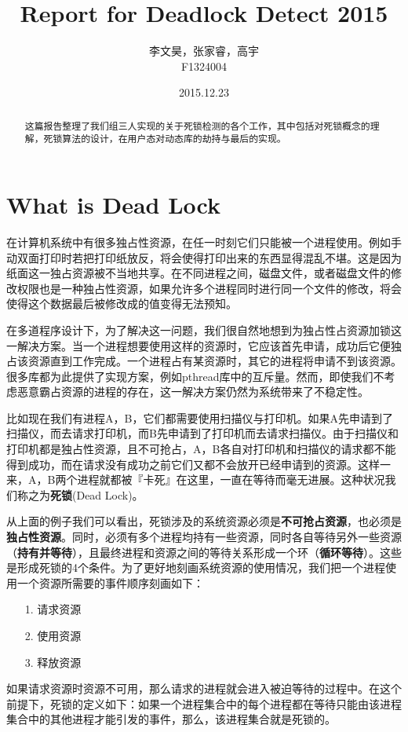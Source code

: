 \documentclass[titlepage]{article}
\begin{document}
\title{Report for Deadlock Detect 2015}
\author{李文昊，张家睿，高宇\\F1324004}
\date{2015.12.23}
\maketitle

\kaishu

\begin{abstract}
\quad \quad 这篇报告整理了我们组三人实现的关于死锁检测的各个工作，其中包括对死锁概念的理解，死锁算法的设计，在用户态对动态库的劫持与最后的实现。
\end{abstract}

\tableofcontents
\newpage

\section{What is Dead Lock}
\indent 在计算机系统中有很多独占性资源，在任一时刻它们只能被一个进程使用。例如手动双面打印时若把打印纸放反，将会使得打印出来的东西显得混乱不堪。这是因为纸面这一独占资源被不当地共享。在不同进程之间，磁盘文件，或者磁盘文件的修改权限也是一种独占性资源，如果允许多个进程同时进行同一个文件的修改，将会使得这个数据最后被修改成的值变得无法预知。

\indent 在多道程序设计下，为了解决这一问题，我们很自然地想到为独占性占资源加锁这一解决方案。当一个进程想要使用这样的资源时，它应该首先申请，成功后它便独占该资源直到工作完成。一个进程占有某资源时，其它的进程将申请不到该资源。很多库都为此提供了实现方案，例如pthread库中的互斥量。然而，即使我们不考虑恶意霸占资源的进程的存在，这一解决方案仍然为系统带来了不稳定性。

\indent 比如现在我们有进程A，B，它们都需要使用扫描仪与打印机。如果A先申请到了扫描仪，而去请求打印机，而B先申请到了打印机而去请求扫描仪。由于扫描仪和打印机都是独占性资源，且不可抢占，A，B各自对打印机和扫描仪的请求都不能得到成功，而在请求没有成功之前它们又都不会放开已经申请到的资源。这样一来，A，B两个进程就都被『卡死』在这里，一直在等待而毫无进展。这种状况我们称之为\textbf{死锁}(Dead Lock)。

\indent 从上面的例子我们可以看出，死锁涉及的系统资源必须是\textbf{不可抢占资源}，也必须是\textbf{独占性资源}。同时，必须有多个进程均持有一些资源，同时各自等待另外一些资源（\textbf{持有并等待}），且最终进程和资源之间的等待关系形成一个环（\textbf{循环等待}）。这些是形成死锁的4个条件。为了更好地刻画系统资源的使用情况，我们把一个进程使用一个资源所需要的事件顺序刻画如下：
\begin{itemize}
	\item[1.] 请求资源
	\item[2.] 使用资源
	\item[3.] 释放资源
\end{itemize}
\indent  如果请求资源时资源不可用，那么请求的进程就会进入被迫等待的过程中。在这个前提下，死锁的定义如下：如果一个进程集合中的每个进程都在等待只能由该进程集合中的其他进程才能引发的事件，那么，该进程集合就是死锁的。
\end{document}

